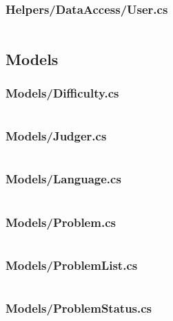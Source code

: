 \documentclass[a4paper]{report}
\begin{document}
\subsubsection{Helpers/DataAccess/User.cs}

\inputminted{csharp}{"../src/Algorithm Dynamics.Core/Helpers/DataAccess/User.cs"}

\subsection{Models}

\subsubsection{Models/Difficulty.cs}

\inputminted{csharp}{"../src/Algorithm Dynamics.Core/Models/Difficulty.cs"}

\subsubsection{Models/Judger.cs}

\inputminted{csharp}{"../src/Algorithm Dynamics.Core/Models/Judger.cs"}

\subsubsection{Models/Language.cs}

\inputminted{csharp}{"../src/Algorithm Dynamics.Core/Models/Language.cs"}

\subsubsection{Models/Problem.cs}

\inputminted{csharp}{"../src/Algorithm Dynamics.Core/Models/Problem.cs"}

\subsubsection{Models/ProblemList.cs}

\inputminted{csharp}{"../src/Algorithm Dynamics.Core/Models/ProblemList.cs"}

\subsubsection{Models/ProblemStatus.cs}

\inputminted{csharp}{"../src/Algorithm Dynamics.Core/Models/ProblemStatus.cs"}
\end{document}
